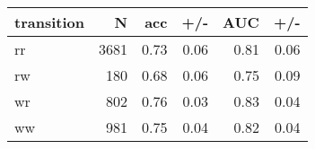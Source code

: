 \begin{tabular}{lr|rr||rr}
\toprule
transition &     N &   acc &   +/- &   AUC &   +/- \\
\midrule
        rr &  3681 &  0.73 &  0.06 &  0.81 &  0.06 \\
        rw &   180 &  0.68 &  0.06 &  0.75 &  0.09 \\
        wr &   802 &  0.76 &  0.03 &  0.83 &  0.04 \\
        ww &   981 &  0.75 &  0.04 &  0.82 &  0.04 \\
\bottomrule
\end{tabular}

